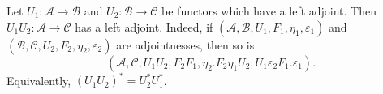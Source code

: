 Let $U_1: \mathcal{A} \rightarrow \mathcal{B}$ and $U_2: \mathcal{B} \rightarrow \mathcal{C}$ be functors which have a left adjoint. Then $U_1U_2: \mathcal{A} \rightarrow \mathcal{C}$ has a left adjoint. Indeed, if $(\mathcal{A}, \mathcal{B}, U_1, F_1, \eta_1, \varepsilon_1)$ and $(\mathcal{B}, \mathcal{C}, U_2, F_2, \eta_2, \varepsilon_2)$ are adjointnesses, then so is
$$(\mathcal{A}, \mathcal{C}, U_1U_2, F_2F_1, \eta_2.F_2\eta_1U_2, U_1\varepsilon_2F_1.\varepsilon_1).$$
Equivalently, $(U_1U_2)^* = U_2^*U_1^*$.

